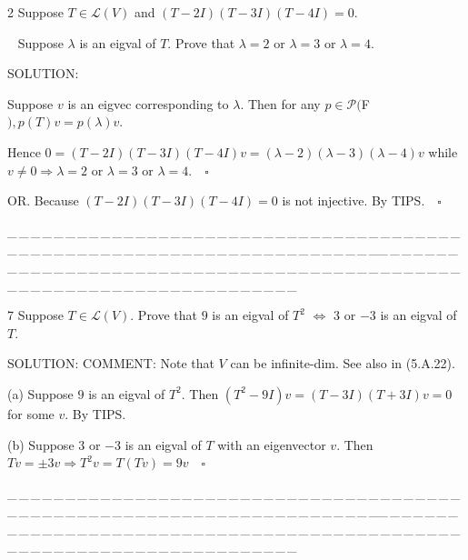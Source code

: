 \documentclass[a4paper, 11pt, UTF8]{article}
\def\Lm{\mathcal{L}}
\def\Po{\mathcal{P}}
\begin{document}
\begin{large}
{\timesbf\Large 2} {\timessl\Large 
Suppose $T\in\Lm(V)$ and $(T - 2I)(T - 3I)(T - 4I) = 0$.}\par\,\,\,
{\timessl\Large Suppose $\lambda$ is an eigval of $T$. Prove that $\lambda = 2$ or $\lambda = 3$ or $\lambda = 4$.
}\par
{\timesbf S\footnotesize{OLUTION:}}\par\quad
Suppose $v$ is an eigvec corresponding to $\lambda.$ Then for any $p\in\Po(${\timesbf F}$),p(T)v=p(\lambda)v.$\par\quad
Hence $0=(T - 2I)(T - 3I)(T - 4I)v=(\lambda-2)(\lambda-3)(\lambda-4)v$ while $v\neq 0\Rightarrow\lambda = 2$ or $\lambda = 3$ or $\lambda = 4.\quad\square$\par\quad
O{\small R.} Because $(T-2I)(T-3I)(T-4I)=0$ is not injective. By T{\small IPS}.$\quad\square$\par
{\tiny \_\,\_\,\_\,\_\,\_\,\_\,\_\,\_\,\_\,\_\,\_\,\_\,\_\,\_\,\_\,\_\,\_\,\_\,\_\,\_\,\_\,\_\,\_\,\_\,\_\,\_\,\_\,\_\,\_\,\_\,\_\,\_\,\_\,\_\,\_\,\_\,\_\,\_\,\_\,\_\,\_\,\_\,\_\,\_\,\_\,\_\,\_\,\_\,\_\,\_\,\_\,\_\,\_\,\_\,\_\,\_\,\_\,\_\,\_\,\_\,\_\,\_\,\_\,\_\,\_\,\_\,\_\,\_\,\_\,\_\,\_\_\,\_\,\_\,\_\,\_\,\_\,\_\,\_\,\_\,\_\,\_\,\_\,\_\,\_\,\_\,\_\,\_\,\_\,\_\,\_\,\_\,\_\,\_\,\_\,\_\,\_\,\_\,\_\,\_\,\_\,\_\,\_\,\_\,\_\,\_\,\_\,\_\,\_\,\_\,\_\,\_\,\_\,\_\,\_\,\_\,\_\,\_\,\_\,\_\,\_\,\_\,\_\,\_\,\_\,\_\,\_\,\_\,\_\,\_\,\_\,\_\,\_\,\_\,\_\,\_\,\_\,\_\,\_\,\_\,\_\,\_}\par

{\timesbf\Large 7} {\timessl\Large 
Suppose $T\in\Lm(V)$. Prove that $9$ is an eigval of $T^2$ $\Longleftrightarrow$ $3$ or $-3$ is an eigval of $T$.}\par
{\timesbf S\footnotesize{OLUTION:}} C{\small OMMENT:} Note that $V$ can be infinite-dim. See also in (5.A.22).\par\quad
(a) Suppose $9$ is an eigval of $T^2.$ 
Then $(T^2-9I)v=(T-3I)(T+3I)v=0$ for some $v.$ By T{\small IPS.}\par\quad
(b) Suppose $3$ or $-3$ is an eigval of $T$ with an eigenvector $v.$ Then $Tv=\pm 3v\Rightarrow T^2 v=T(Tv)=9v\quad\square$\par
\par
{\tiny \_\,\_\,\_\,\_\,\_\,\_\,\_\,\_\,\_\,\_\,\_\,\_\,\_\,\_\,\_\,\_\,\_\,\_\,\_\,\_\,\_\,\_\,\_\,\_\,\_\,\_\,\_\,\_\,\_\,\_\,\_\,\_\,\_\,\_\,\_\,\_\,\_\,\_\,\_\,\_\,\_\,\_\,\_\,\_\,\_\,\_\,\_\,\_\,\_\,\_\,\_\,\_\,\_\,\_\,\_\,\_\,\_\,\_\,\_\,\_\,\_\,\_\,\_\,\_\,\_\,\_\,\_\,\_\,\_\,\_\,\_\_\,\_\,\_\,\_\,\_\,\_\,\_\,\_\,\_\,\_\,\_\,\_\,\_\,\_\,\_\,\_\,\_\,\_\,\_\,\_\,\_\,\_\,\_\,\_\,\_\,\_\,\_\,\_\,\_\,\_\,\_\,\_\,\_\,\_\,\_\,\_\,\_\,\_\,\_\,\_\,\_\,\_\,\_\,\_\,\_\,\_\,\_\,\_\,\_\,\_\,\_\,\_\,\_\,\_\,\_\,\_\,\_\,\_\,\_\,\_\,\_\,\_\,\_\,\_\,\_\,\_\,\_\,\_\,\_\,\_\,\_}\par


\end{large}
\end{document}
